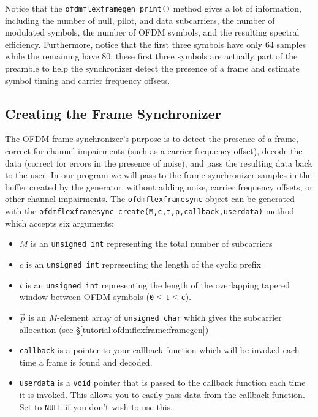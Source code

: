 %
Notice that the {\tt ofdmflexframegen\_print()} method gives a lot of
information, including
the number of null, pilot, and data subcarriers,
the number of modulated symbols,
the number of OFDM symbols,
and the resulting spectral efficiency.
Furthermore, notice that the first three symbols have only 64 samples
while the remaining have 80;
these first three symbols are actually part of the preamble to help the
synchronizer detect the presence of a frame and estimate symbol timing
and carrier frequency offsets.

%
%
\subsection{Creating the Frame Synchronizer}
\label{tutorial:ofdmflexframe:framesync}
The OFDM frame synchronizer's purpose is to detect the presence of a
frame, correct for channel impairments (such as a carrier frequency
offset), decode the data (correct for errors in the presence of noise),
and pass the resulting data back to the user.
In our program we will pass to the frame synchronizer samples in the
buffer created by the generator, without adding noise, carrier frequency
offsets, or other channel impairments.
%
The {\tt ofdmflexframesync} object can be generated with the
{\tt ofdmflexframesync\_create(M,c,t,p,callback,userdata)} method which
accepts six arguments:
%
\begin{itemize}
\item $M$ is an {\tt unsigned int} representing the total number of
    subcarriers
\item $c$ is an {\tt unsigned int} representing the length of the
    cyclic prefix
\item $t$ is an {\tt unsigned int} representing the length of the
    overlapping tapered window between OFDM symbols
    ({\tt 0}$\leq${\tt t}$\leq${\tt c}).
\item $\vec{p}$ is an $M$-element array of {\tt unsigned char} which
    gives the subcarrier allocation
    (see \S\ref{tutorial:ofdmflexframe:framegen})
\item {\tt callback}
    is a pointer to your callback function which will be invoked each
    time a frame is found and decoded.
\item {\tt userdata}
    is a {\tt void} pointer that is passed to the callback function each
    time it is invoked.
    This allows you to easily pass data from the callback function.
    Set to {\tt NULL} if you don't wish to use this.
\end{itemize}
